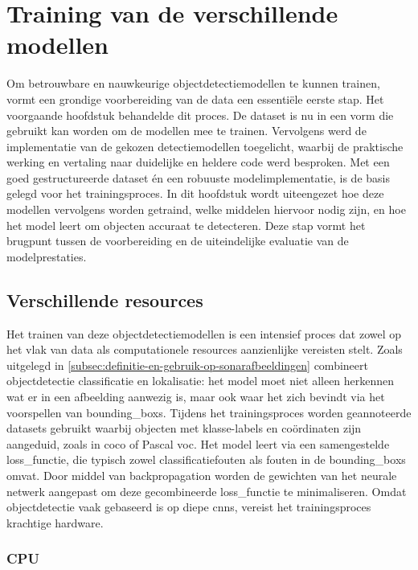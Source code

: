 \chapter{Training van de verschillende modellen}
\label{ch:training}

Om betrouwbare en nauwkeurige objectdetectiemodellen te kunnen trainen, vormt een grondige voorbereiding van de data een essentiële eerste stap. Het voorgaande hoofdstuk behandelde dit proces. De dataset is nu in een vorm die gebruikt kan worden om de modellen mee te trainen. Vervolgens werd de implementatie van de gekozen detectiemodellen toegelicht, waarbij de praktische werking en vertaling naar duidelijke en heldere code werd besproken. Met een goed gestructureerde dataset én een robuuste modelimplementatie, is de basis gelegd voor het trainingsproces. In dit hoofdstuk wordt uiteengezet hoe deze modellen vervolgens worden getraind, welke middelen hiervoor nodig zijn, en hoe het model leert om objecten accuraat te detecteren. Deze stap vormt het brugpunt tussen de voorbereiding en de uiteindelijke evaluatie van de modelprestaties. \\

\section{Verschillende resources}

Het trainen van deze objectdetectiemodellen is een intensief proces dat zowel op het vlak van data als computationele resources aanzienlijke vereisten stelt. Zoals uitgelegd in \ref{subsec:definitie-en-gebruik-op-sonarafbeeldingen} combineert objectdetectie classificatie en lokalisatie: het model moet niet alleen herkennen wat er in een afbeelding aanwezig is, maar ook waar het zich bevindt via het voorspellen van \glspl{bounding_box}. Tijdens het trainingsproces worden geannoteerde datasets gebruikt waarbij objecten met klasse-labels en coördinaten zijn aangeduid, zoals in \gls{coco} of Pascal \gls{voc}. Het model leert via een samengestelde \gls{loss_functie}, die typisch zowel classificatiefouten als fouten in de \glspl{bounding_box} omvat. Door middel van \gls{backpropagation} worden de gewichten van het neurale netwerk aangepast om deze gecombineerde \gls{loss_functie} te minimaliseren. Omdat objectdetectie vaak gebaseerd is op diepe \glspl{cnn}, vereist het trainingsproces krachtige hardware. \\

\subsection{CPU}

